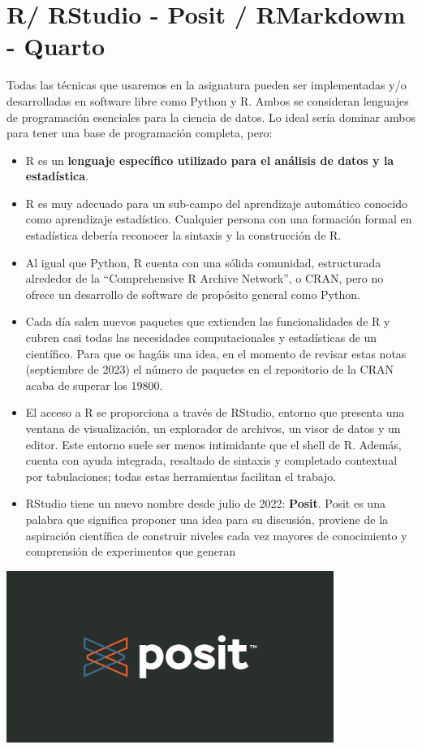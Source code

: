 \documentclass[
  letterpaper,
  DIV=11,
  numbers=noendperiod]{scrreprt}
\begin{document}
\section{R/ RStudio - Posit / RMarkdowm -
Quarto}\label{r-rstudio---posit-rmarkdowm---quarto}

Todas las técnicas que usaremos en la asignatura pueden ser
implementadas y/o desarrolladas en software libre como Python y R. Ambos
se consideran lenguajes de programación esenciales para la ciencia de
datos. Lo ideal sería dominar ambos para tener una base de programación
completa, pero:

\begin{itemize}
\item
  R es un \textbf{lenguaje específico utilizado para el análisis de
  datos y la estadística}.
\item
  R es muy adecuado para un sub-campo del aprendizaje automático
  conocido como aprendizaje estadístico. Cualquier persona con una
  formación formal en estadística debería reconocer la sintaxis y la
  construcción de R.
\item
  Al igual que Python, R cuenta con una sólida comunidad, estructurada
  alrededor de la ``Comprehensive R Archive Network'', o CRAN, pero no
  ofrece un desarrollo de software de propósito general como Python.
\item
  Cada día salen nuevos paquetes que extienden las funcionalidades de R
  y cubren casi todas las necesidades computacionales y estadísticas de
  un científico. Para que os hagáis una idea, en el momento de revisar
  estas notas (septiembre de 2023) el número de paquetes en el
  repositorio de la CRAN acaba de superar los 19800.
\item
  El acceso a R se proporciona a través de RStudio, entorno que presenta
  una ventana de visualización, un explorador de archivos, un visor de
  datos y un editor. Este entorno suele ser menos intimidante que el
  shell de R. Además, cuenta con ayuda integrada, resaltado de sintaxis
  y completado contextual por tabulaciones; todas estas herramientas
  facilitan el trabajo.
\item
  RStudio tiene un nuevo nombre desde julio de 2022: \textbf{Posit}.
  Posit es una palabra que significa proponer una idea para su
  discusión, proviene de la aspiración científica de construir niveles
  cada vez mayores de conocimiento y comprensión de experimentos que
  generan
\end{itemize}

\begin{center}
\includegraphics[width=0.8\textwidth,height=\textheight]{Figuras/posit.jpg}
\end{center}
\end{document}
